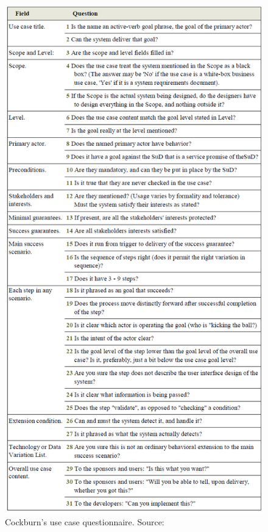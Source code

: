 \begin{figure}
	\centering
	\includegraphics[scale=0.7]{images/cockburn_usecase_questionnaire}
	\caption{Cockburn's use case questionnaire. Source: \cite{Cockburn_2000}}
	\label{fig:cockburn_usecase_questionnaire}
\end{figure}

